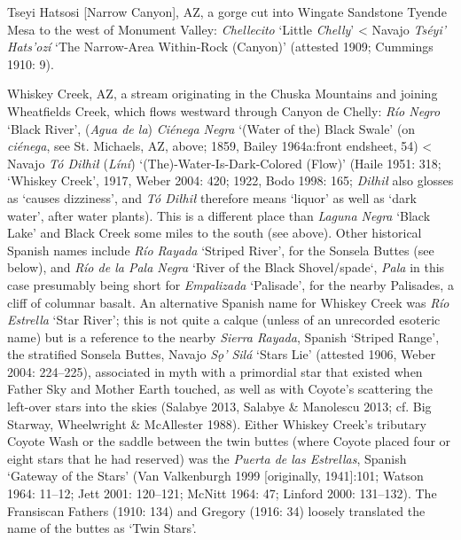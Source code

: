 Tseyi Hatsosi [Narrow Canyon], AZ, a gorge cut into Wingate Sandstone Tyende Mesa to the west of Monument Valley: \textit{Chellecito} ‘Little \textit{Chelly}’ {\textless} Navajo \textit{Tséyi’ Hats’ozí} ‘The Narrow-Area Within-Rock (Canyon)’ (attested 1909; Cummings 1910: 9).

Whiskey Creek, AZ, a stream originating in the Chuska Mountains and joining Wheatfields Creek, which flows westward through Canyon de Chelly:  \textit{Río Negro} ‘Black River’, (\textit{Agua de la}) \textit{Ciénega Negra }‘(Water of the) Black Swale’ (on \textit{ciénega}, see St. Michaels, AZ, above; 1859, Bailey 1964a:front endsheet, 54) {\textless} Navajo \textit{Tó Diłhił }(\textit{Líní})\textit{ }‘(The)-Water-Is-Dark-Colored (Flow)’ (Haile 1951: 318; `Whiskey Creek’, 1917, Weber 2004: 420; 1922, Bodo 1998: 165; \textit{Diłhił} also glosses as ‘causes dizziness’, and \textit{Tó Diłhił} therefore means ‘liquor’ as well as ‘dark water’, after water plants).  This is a different place than \textit{Laguna Negra} ‘Black Lake’ and Black Creek some miles to the south (see above).  Other historical Spanish names include \textit{Río Rayada} ‘Striped River’, for the Sonsela Buttes (see below), and \textit{Río de la Pala Negra} ‘River of the Black Shovel/spade‘, \textit{Pala }in this case presumably being short for \textit{Empalizada} ‘Palisade’, for the nearby Palisades, a cliff of columnar basalt.  An alternative Spanish name for Whiskey Creek was \textit{Río Estrella} ‘Star River’; this is not quite a calque (unless of an unrecorded esoteric name) but is a reference to the nearby \textit{Sierra Rayada}, Spanish ‘Striped Range’, the stratified Sonsela Buttes, Navajo \textit{Sǫ' Silá} ‘Stars Lie’ (attested 1906, Weber 2004: 224–225), associated in myth with a primordial star that existed when Father Sky and Mother Earth touched, as well as with Coyote's scattering the left-over stars into the skies (Salabye 2013, Salabye \& Manolescu 2013; cf. Big Starway, Wheelwright \& McAllester 1988).  Either Whiskey Creek’s tributary Coyote Wash or the saddle between the twin buttes (where Coyote placed four or eight stars that he had reserved) was the \textit{Puerta de las Estrellas}, Spanish ‘Gateway of the Stars’ (Van Valkenburgh 1999 [originally, 1941]:101;  Watson 1964: 11–12; Jett 2001: 120–121; McNitt 1964: 47; Linford 2000: 131–132).  The Fransiscan Fathers (1910: 134) and Gregory (1916: 34) loosely translated the name of the buttes as ‘Twin Stars’.

